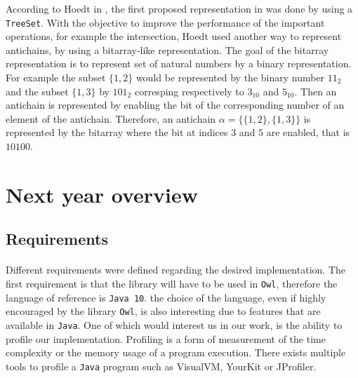 \documentclass[letterpaper]{article}
\theoremstyle{definition}
\begin{document}
According to Hoedt in
\cite{hoedt}, the first proposed representation
in \cite{causemaecker1} was done by using
a \texttt{TreeSet}. With the objective to improve the performance of
the important operations, for example the intersection, Hoedt used
another way to represent antichains, by using a bitarray-like representation.
The goal of the bitarray representation is to represent set of natural numbers
by a binary representation. For example the subset $\{1, 2\}$ would be
represented by the binary number $11_2$ and the subset $\{1, 3\}$
by $101_2$ corresping respectively to $3_{10}$ and $5_{10}$. Then an antichain
is represented by enabling the bit of the corresponding number of an element
of the antichain. Therefore, an antichain $\alpha = \{\{1, 2\}, \{1, 3\}\}$
is represented by the bitarray  where the bit at indices $3$ and $5$
are enabled, that is $10100$.

\section{Next year overview}

\label{conclusion}

\subsection{Requirements}

\paragraph{}


Different requirements were defined regarding the desired implementation.
The first requirement is that the library will have to be used in
\texttt{Owl}, therefore the language of reference is \texttt{Java 10}.
the choice of the language, even if highly encouraged by
the library \texttt{Owl}, is also interesting due to features that
are available in \texttt{Java}. One of which would interest us
in our work, is the ability to profile our implementation.
Profiling is a form of measurement of the time complexity or
the memory usage of a program execution. There exists multiple
tools to profile a \texttt{Java} program such as VisualVM, YourKit
or JProfiler.
\end{document}
